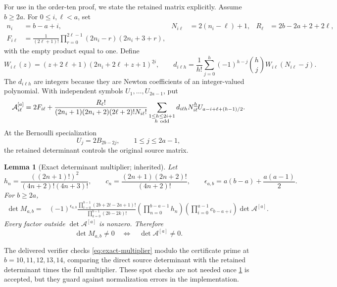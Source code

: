\documentclass[11pt]{article}
\newtheorem{lemma}[theorem]{Lemma}
\theoremstyle{definition}
\newcommand{\fall}[2]{#1^{\underline{#2}}}
\newcommand{\A}{\mathcal{A}}
\begin{document}
For use in the order-ten proof, we state the retained matrix explicitly.
Assume $b\ge2a$.  For $0\le i,\ell<a$, set
\begin{align}
 n_i&=b-a+i,&
 N_{i\ell}&=2(n_i-\ell)+1,&
 R_\ell&=2b-2a+2+2\ell,\label{eq:retained-indices}\\
 F_{i\ell}&=\frac1{(2\ell+1)!}
 \prod_{r=0}^{2\ell-1}(2n_i-r)(2n_i+3+r),
 \label{eq:F-entry}
\end{align}
with the empty product equal to one.  Define
\begin{equation}
 W_{i\ell}(z)=(z+2\ell+1)
              \fall{(2n_i+2\ell+z+1)}{2i},
 \qquad
 d_{i\ell h}=\frac1{h!}\sum_{j=0}^h
 (-1)^{h-j}\binom hjW_{i\ell}(N_{i\ell}-j).
 \label{eq:d-finite-difference}
\end{equation}
The $d_{i\ell h}$ are integers because they are Newton coefficients of
an integer-valued polynomial.  With independent symbols
$U_1,\ldots,U_{2a-1}$, put
\begin{equation}
 \A^{[a]}_{i\ell}
 =2F_{i\ell}
 +\frac{R_\ell!}
 {(2n_i+1)(2n_i+2)(2\ell+2)!N_{i\ell}!}
 \sum_{\substack{1\le h\le2i+1\\h\ {\rm odd}}}
 d_{i\ell h}\fall{N_{i\ell}}h
 U_{a-i+\ell+(h-1)/2}.
 \label{eq:retained-A}
\end{equation}
At the Bernoulli specialization
\begin{equation}
 U_j=2B_{2b-2j},\qquad 1\le j\le2a-1,
 \label{eq:U-specialization}
\end{equation}
the retained determinant controls the original source matrix.

\begin{lemma}[Exact determinant multiplier; inherited]
\label{lem:multiplier}
Let
\[
 h_n=\frac{((2n+1)!)^2}{(4n+2)!(4n+3)!},
 \qquad
 c_n=\frac{(2n+1)(2n+2)!}{(4n+2)!},
 \qquad
 \epsilon_{a,b}=a(b-a)+\frac{a(a-1)}2.
\]
For $b\ge2a$,
\begin{align}
 \det M_{a,b}
 ={}&(-1)^{\epsilon_{a,b}}
 \frac{\prod_{t=0}^{b-1}(2b+2t-2a+1)!}
      {\prod_{k=0}^{b-1}(2b-2k)!}
 \left(\prod_{n=0}^{b-a-1}h_n\right)
 \left(\prod_{i=0}^{a-1}c_{b-a+i}\right)
 \det\A^{[a]}.
 \label{eq:exact-multiplier}
\end{align}
Every factor outside $\det\A^{[a]}$ is nonzero.  Therefore
\[
 \det M_{a,b}\ne0
 \quad\Longleftrightarrow\quad
 \det\A^{[a]}\ne0.
\]
\end{lemma}

The delivered verifier checks \eqref{eq:exact-multiplier} modulo the
certificate prime at $b=10,11,12,13,14$, comparing the direct source
determinant with the retained determinant times the full multiplier.
These spot checks are not needed once \cref{lem:multiplier} is accepted,
but they guard against normalization errors in the implementation.
\end{document}
